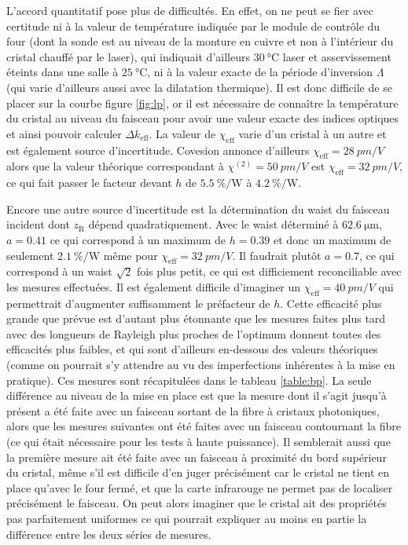 \documentclass[11pt,a4paper]{article}
\newcommand{\zr}{z_\mathsc{R}}
\newcommand{\chie}{\chi_\mathsc{eff}}
\newcommand{\dke}{\Delta k_\mathsc{eff}}
\newcommand{\alphae}[1]{\SI{#1}{\percent\per\watt}}
\newcommand{\mathsc}[1]{\mathrm{\scriptscriptstyle {#1}}}
\begin{document}
L'accord quantitatif pose plus de difficultés. En effet, on ne peut se fier avec certitude ni à la valeur de température indiquée par le module de contrôle du four (dont la sonde est au niveau de la monture en cuivre et non à l'intérieur du cristal chauffé par le laser), qui indiquait d'ailleurs $\SI{30}{\celsius}$ laser et asservissement éteints dans une salle à $\SI{25}{\celsius}$, ni à la valeur exacte de la période d'inversion $\Lambda$ (qui varie d'ailleurs aussi avec la dilatation thermique). Il est donc difficile de se placer sur la courbe figure \ref{fig:lp}, or il est nécessaire de connaître la température du cristal au niveau du faisceau pour avoir une valeur exacte des indices optiques et ainsi pouvoir calculer $\dke$.
La valeur de $\chie$ varie d'un cristal à un autre et est également source d'incertitude. Covesion annonce d'ailleurs $\chie = \SI{28}{pm/V}$ alors que la valeur théorique correspondant à $\chi^{(2)}=\SI{50}{pm/V}$ est $\chie = \SI{32}{pm/V}$, ce qui fait passer le facteur devant $h$ de $\SI{5.5}{\percent\per\watt}$ à $\SI{4.2}{\percent\per\watt}$.


Encore une autre source d'incertitude est la détermination du waist du faisceau incident dont $\zr$ dépend quadratiquement. Avec le waist déterminé à $\SI{62.6}{\micro\meter}$, $a=0.41$ ce qui correspond à un maximum de $h = 0.39$ et donc un maximum de seulement $\alphae{2.1}$ même pour $\chie = \SI{32}{pm/V}$. Il faudrait plutôt $a=0.7$, ce qui correspond à un waist $\sqrt2$ fois plus petit, ce qui est difficiement reconciliable avec les mesures effectuées. %
Il est également difficile d'imaginer un $\chie=\SI{40}{pm/V}$ qui permettrait d'augmenter suffisamment le préfacteur de $h$. Cette efficacité plus grande que prévue est d'autant plus étonnante que les mesures faites plus tard avec des longueurs de Rayleigh plus proches de l'optimum donnent toutes des efficacités plus faibles, et qui sont d'ailleurs en-dessous des valeurs théoriques (comme on pourrait s'y attendre au vu des imperfections inhérentes à la mise en pratique). Ces mesures sont récapitulées dans le tableau \ref{table:bp}. La seule différence au niveau de la mise en place est que la mesure dont il s'agit jusqu'à présent a été faite avec un faisceau sortant de la fibre à cristaux photoniques, alors que les mesures suivantes ont été faites avec un faisceau contournant la fibre (ce qui était nécessaire pour les tests à haute puissance). Il semblerait aussi que la première mesure ait été faite avec un faisceau à proximité du bord supérieur du cristal, même s'il est difficile d'en juger précisément car le cristal ne tient en place qu'avec le four fermé, et que la carte infrarouge ne permet pas de localiser précisément le faisceau. On peut alors imaginer que le cristal ait des propriétés pas parfaitement uniformes ce qui pourrait expliquer au moins en partie la différence entre les deux séries de mesures.
\end{document}
